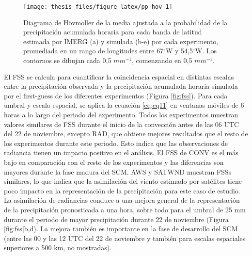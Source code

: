 \documentclass[12pt,oneside,a4paper]{reedthesis}
\begin{document}
\begin{figure}

{\centering \texttt{[image: thesis\_files/figure-latex/pp-hov-1]} 

}

\caption{Diagrama de Hövmoller de la media ajustada a la probabilidad de la precipitación acumulada horaria para cada banda de latitud estimada por IMERG (a) y simulada (b-e) por cada experimento, promediada en un rango de longitudes entre 67\(^{\circ}\)W y 54,5\(^{\circ}\)W. Los contornos se dibujan cada 0,5 \(mm^{-1}\), comenzando en 0,5 \(mm^{-1}\).}\label{fig:pp-hov}
\end{figure}
El FSS se calcula para cuantificar la coincidencia espacial en distintas escalas entre la precipitación observada y la precipitación acumulada horaria simulada por el first-guess de los diferentes experimentos (Figura \ref{fig:fss}). Para cada umbral y escala espacial, se aplica la ecuación \eqref{eq:eq11} en ventanas móviles de 6 horas a lo largo del periodo del experimento. Todos los experimentos muestran valores similares de FSS durante el inicio de la convección antes de las 06 UTC del 22 de noviembre, excepto RAD, que obtiene mejores resultados que el resto de los experimentos durante este periodo. Esto indica que las observaciones de radiancia tienen un impacto positivo en el análisis. El FSS de CONV es el más bajo en comparación con el resto de los experimentos y las diferencias son mayores durante la fase madura del SCM. AWS y SATWND muestran FSSs similares, lo que indica que la asimilación del viento estimado por satélites tiene poco impacto en la representación de la precipitación para este caso de estudio. La asimilación de radiancias conduce a una mejora general de la representación de la precipitación pronosticada a una hora, sobre todo para el umbral de 25 mm durante el periodo de mayor precipitación durante 22 de noviembre (Figura \ref{fig:fss}b,d). La mejora también es importante en la fase de desarrollo del SCM (entre las 00 y las 12 UTC del 22 de noviembre y también para escalas espaciales superiores a 500 km, no mostradas).
\end{document}
